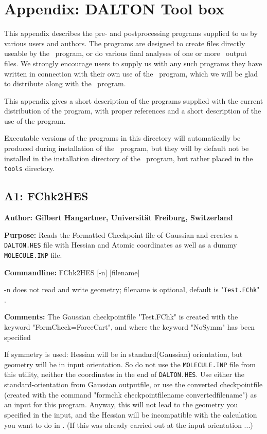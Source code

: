 \section*{Appendix: DALTON Tool box}

This appendix describes the pre- and postprocessing programs
supplied to us by various users and authors. The programs are designed
to create files directly useable by the \siraba\ program, or do
various final analyses of one or more \siraba\ output files. We
strongly encourage users to supply us with any such programs they have
written in connection with their own use of the \siraba\ program,
which we will be glad to distribute along with the \siraba\
program.

This appendix gives a short description of the programs supplied with
the current distribution of the program, with proper references and a
short description of the use of the program.

Executable versions of the programs in this directory will
automatically be produced during installation of the \siraba\ program,
but they will by default not be installed in the installation
directory of the \siraba\ program, but rather placed in the
\verb|tools| directory.

\subsection*{A1: FChk2HES}

\noindent
{\large\bf Author: \normalsize\large Gilbert Hangartner,
Universit\"{a}t Freiburg, Switzerland}

\smallskip

\noindent 
{\bf Purpose:} Reads the Formatted Checkpoint file of Gaussian  
     and creates a \verb|DALTON.HES| file with Hessian and Atomic coordinates
     as well as a dummy \verb|MOLECULE.INP| file.

\smallskip
\noindent
{\bf Commandline:} FChk2HES [-n] [filename]

-n does not read and write geometry; filename is optional, default is
"\verb|Test.FChk|" .

\smallskip
\noindent
{\bf Comments:}     The Gaussian checkpointfile "Test.FChk" is created
     with the keyword "FormCheck=ForceCart", and where the keyword "NoSymm"
     has  been specified

If symmetry is used: Hessian will be in standard(Gaussian) orientation,
        but geometry will be in input orientation. So do not use the
        \verb|MOLECULE.INP| file from this utility, 
        neither the coordinates in the end of \verb|DALTON.HES|.
        Use either the standard-orientation from Gaussian outputfile, or
        use the converted checkpointfile (created with the command
        "formchk checkpointfilename convertedfilename") as an input for
        this program. Anyway, this will not lead to the geometry you 
        specified in the input, and the Hessian will be incompatible with the
        calculation you want to do in \siraba. (If this was already carried
        out at the input orientation ...)

